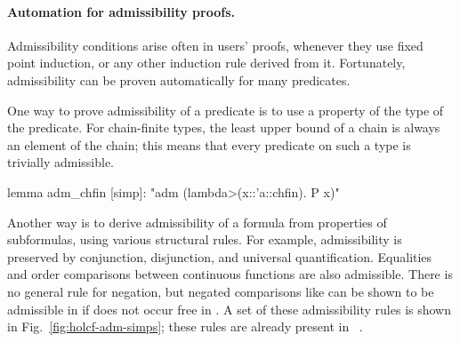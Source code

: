 \paragraph{Automation for admissibility proofs.} Admissibility conditions arise often in users' proofs, whenever they use fixed point induction, or any other induction rule derived from it. Fortunately, admissibility can be proven automatically for many predicates.

One way to prove admissibility of a predicate is to use a property of the type of the predicate. For chain-finite types, the least upper bound of a chain is always an element of the chain; this means that every predicate on such a type is trivially admissible.

\begin{isacode}
lemma adm_chfin [simp]: "adm (\<lambda>(x::'a::chfin). P x)"
\end{isacode}

Another way is to derive admissibility of a formula from properties of subformulas, using various structural rules. For example, admissibility is preserved by conjunction, disjunction, and universal quantification. Equalities and order comparisons between continuous functions are also admissible. There is no general rule for negation, but negated comparisons like  can be shown to be admissible in  if  does not occur free in . A set of these admissibility rules is shown in Fig.~\ref{fig:holcf-adm-simps}; these rules are already present in ~\cite{mueller98thesis, hol+lcf}.


